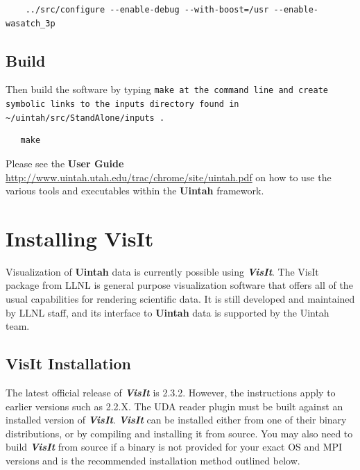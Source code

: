 \documentclass[12pt]{article}
\newcommand{\TT}[1]{\tt{#1} \normalfont}
\begin{document}
\begin{verbatim}
    ../src/configure --enable-debug --with-boost=/usr --enable-wasatch_3p
\end{verbatim}

\subsection{Build}

Then build the software by typing \TT{make} at the command line and create symbolic links to the inputs directory found in \TT{\textasciitilde/uintah/src/StandAlone/inputs}.
\begin{verbatim}
   make
\end{verbatim}


Please see the \textbf{User Guide}
\url{http://www.uintah.utah.edu/trac/chrome/site/uintah.pdf} on how to use
the various tools and executables within the \textbf{Uintah}
framework.


\section{Installing VisIt}

Visualization of \textbf{Uintah} data is currently possible using
\textbf{\emph{VisIt}}. The VisIt package from LLNL is general purpose
visualization software that offers all of the usual capabilities for
rendering scientific data.  It is still developed and maintained by
LLNL staff, and its interface to \textbf{Uintah} data is supported by
the Uintah team.



\subsection{VisIt Installation}

The latest official release of \textbf{\emph{VisIt}} is 2.3.2.
However, the instructions apply to earlier versions such as 2.2.X.
The UDA reader plugin must be built against an installed version of
\textbf{\emph{VisIt}}.  \textbf{\emph{VisIt}} can be installed either
from one of their binary distributions, or by compiling and installing
it from source.  You may also need to build \textbf{\emph{VisIt}} from
source if a binary is not provided for your exact OS and MPI versions
and is the recommended installation method outlined below.
\end{document}
